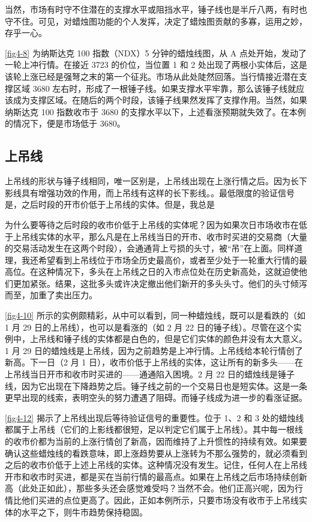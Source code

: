 当然，市场有时守不住潜在的支撑水平或阻挡水平，锤子线也是半斤八两，有时也守不住。可见，对蜡烛图功能的个人发挥，决定了蜡烛图贡献的多寡，运用之妙，存乎一心。


\autoref{fig4-8} 为纳斯达克 100 指数（NDX）5 分钟的蜡烛线图，从 A 点处开始，发动了一轮上冲行情。在接近 3723 的价位，当位置 1 和 2 处出现了两根小实体后，这是该轮上涨已经是强弩之末的第一个征兆。市场从此处陡然回落。当行情接近潜在支撑区域 3680 左右时，形成了一根锤子线。如果支撑水平牢靠，那么该锤子线就应该成为支撑区域。在随后的两个时段，该锤子线果然发挥了支撑作用。当然，如果纳斯达克 100 指数收市于 3680 的支撑水平以下，上述看涨预期就失效了。在本例的情况下，便是市场低于 3680。
\subsection{上吊线}
上吊线的形状与锤子线相同，唯一区别是，上吊线出现在上涨行情之后。因为长下影线具有增强功效的作用，而上吊线有这样的长下影线。。最低限度的验证信号是，之后时段的开市价低于上吊线的实体。但是，我总是

为什么要等待之后时段的收市价低于上吊线的实体呢？因为如果次日市场收市在低于上吊线实体的水平，那么凡是在上吊线当日的开市、收市时买进的交易商（大量的交易活动发生在这两个时段），会通通背上亏损的头寸，被“吊”在上面。同样道理，我还希望看到上吊线位于市场全历史最高价，或者至少处于一轮重大行情的最高位。在这种情况下，多头在上吊线之日的入市点位处在历史新高处，这就迫使他们更加紧张。结果，这批多头或许决定撤出他们新开的多头头寸。他们的头寸倾泻而至，加重了卖出压力。


\autoref{fig4-10} 所示的实例颇精彩，从中可以看到，同一种蜡烛线，既可以是看跌的（如 1 月 29 日的上吊线），也可以是看涨的（如 2 月 22 日的锤子线）。尽管在这个实例中，上吊线和锤子线的实体都是白色的，但是它们实体的颜色并没有太大意义。1 月 29 日的蜡烛线是上吊线，因为之前趋势是上冲行情。上吊线给本轮行情创了新高。下一日（2 月 1 日），收市价低于上吊线的实体，这让所有的新多头——在上吊线当日开市和收市时买进的——通通陷入困境。2 月 22 日的蜡烛线是锤子线，因为它出现在下降趋势之后。锤子线之前的一个交易日也是短实体。这是一条更早出现的线索，表明空头的努力遭遇了阻碍。而锤子线成为进一步的看涨证据。

\autoref{fig4-12} 揭示了上吊线出现后等待验证信号的重要性。位于 1、2 和 3 处的蜡烛线都属于上吊线（它们的上影线都很短，足以判定它们属于上吊线）。其中每一根线的收市价都为当前的上涨行情创了新高，因而维持了上升惯性的持续有效。如果要确认这些蜡烛线的看跌意味，即上涨趋势要从上涨转为不那么强势的，就必须看到之后的收市价低于上述上吊线的实体。这种情况没有发生。记住，任何人在上吊线开市和收市时买进，都是买在当前行情的最高点。如果在上吊线之后市场持续创新高（此处正如此），那些多头还会感觉难受吗？当然不会。他们正高兴呢，因为行情比他们买进的点位更高了。因此，正如本例所示，只要市场没有收市于上吊线实体的水平之下，则牛市趋势保持稳固。

